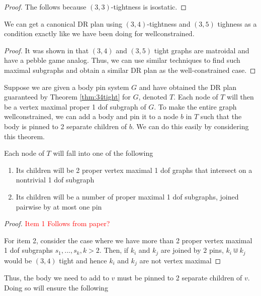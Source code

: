 \begin{proof}
    The follows because $(3,3)$-tightness is isostatic.
\end{proof}

\begin{theorem}
    We can get a canonical DR plan using $(3,4)$-tightness and $(3,5)$ tighness as a condition exactly like we have been doing for wellconstrained.
\end{theorem}

\begin{proof}
    It was shown in \cite{XX} that $(3,4)$ and $(3,5)$ tight graphs are matroidal and have a pebble game analog. Thus, we can use similar techniques to find such maximal subgraphs and obtain a similar DR plan as the well-constrained case.
\end{proof}

Suppose we are given a body pin system $G$ and have obtained the DR plan guaranteed by Theorem \ref{thm:34tight} for $G$, denoted $T$. Each node of $T$ will then be a vertex maximal proper 1 dof subgraph of $G$. To make the entire graph wellconstrained, we can add a body and pin it to a node $b$ in $T$ such that the body is pinned to 2 separate children of $b$. We can do this easily by considering this theorem.

\begin{theorem}
    Each node of $T$ will fall into one of the following
    \begin{enumerate}
        \item Its children will be 2 proper vertex maximal 1 dof graphs that intersect on a nontrivial 1 dof subgraph
        \item Its children will be a number of proper maximal 1 dof subgraphs, joined pairwise by at most one pin  
    \end{enumerate}
\end{theorem}

\begin{proof}
    \textcolor{red}{Item 1 Follows from paper?}

    For item 2, consider the case where we have more than 2 proper vertex maximal 1 dof subgraphs $s_1, ..., s_k, k > 2$. Then, if $k_i$ and $k_j$ are joined by $2$ pins, $k_i \Cup k_j$ would be $(3,4)$ tight and hence $k_i$ and $k_j$ are not vertex maximal
\end{proof}

Thus, the body we need to add to $v$ must be pinned to 2 separate children of $v$. Doing so will ensure the following

